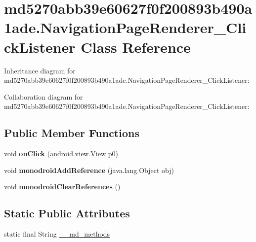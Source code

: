 \hypertarget{classmd5270abb39e60627f0f200893b490a1ade_1_1_navigation_page_renderer___click_listener}{}\section{md5270abb39e60627f0f200893b490a1ade.\+Navigation\+Page\+Renderer\+\_\+\+Click\+Listener Class Reference}
\label{classmd5270abb39e60627f0f200893b490a1ade_1_1_navigation_page_renderer___click_listener}


Inheritance diagram for md5270abb39e60627f0f200893b490a1ade.\+Navigation\+Page\+Renderer\+\_\+\+Click\+Listener\+:


Collaboration diagram for md5270abb39e60627f0f200893b490a1ade.\+Navigation\+Page\+Renderer\+\_\+\+Click\+Listener\+:
\subsection*{Public Member Functions}
\begin{DoxyCompactItemize}
\item 
\mbox{\label{classmd5270abb39e60627f0f200893b490a1ade_1_1_navigation_page_renderer___click_listener_a975d110457a3664db2a90bdea3629a66}} 
void {\bfseries on\+Click} (android.\+view.\+View p0)
\item 
\mbox{\label{classmd5270abb39e60627f0f200893b490a1ade_1_1_navigation_page_renderer___click_listener_a428aab41c9b41260494dc6a3cdea0121}} 
void {\bfseries monodroid\+Add\+Reference} (java.\+lang.\+Object obj)
\item 
\mbox{\label{classmd5270abb39e60627f0f200893b490a1ade_1_1_navigation_page_renderer___click_listener_af660803b06bd1e254786d56ff75093bd}} 
void {\bfseries monodroid\+Clear\+References} ()
\end{DoxyCompactItemize}
\subsection*{Static Public Attributes}
\begin{DoxyCompactItemize}
\item 
static final String \hyperlink{classmd5270abb39e60627f0f200893b490a1ade_1_1_navigation_page_renderer___click_listener_a3e5649188cf3a8722bdde6c7da3dc717}{\+\_\+\+\_\+md\+\_\+methods}
\end{DoxyCompactItemize}


